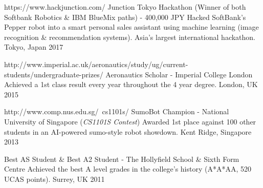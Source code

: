

\begin{cvhonors}

  \cvhonor
  	{https://www.hackjunction.com/}
    {Junction Tokyo Hackathon (Winner of both Softbank Robotics \& IBM BlueMix paths) - 400,000 JPY} %
    {Hacked SoftBank's Pepper robot into a smart personal sales assistant using machine learning (image recognition \& recommendation systems). Asia's largest international hackathon.} %
    {Tokyo, Japan} %
    {2017} %


  \cvhonor
  	{http://www.imperial.ac.uk/aeronautics/study/ug/current-students/undergraduate-prizes/}
    {Aeronautics Scholar - Imperial College London} %
    {Achieved a 1st class result every year throughout the 4 year degree.} %
    {London, UK} %
    {2015} %

  \cvhonor
  	{http://www.comp.nus.edu.sg/~cs1101s/}
    {SumoBot Champion - National University of Singapore (\emph{CS1101S Contest})} %
    {Awarded 1st place against 100 other students in an AI-powered sumo-style robot showdown.} %
    {Kent Ridge, Singapore} %
    {2013} %

  \cvhonor
  	{}
    {Best AS Student \& Best A2 Student - The Hollyfield School \& Sixth Form Centre} %
    {Achieved the best A level grades in the college's history (A*A*AA, 520 UCAS points).} %
    {Surrey, UK} %
    {2011} %


\end{cvhonors}
